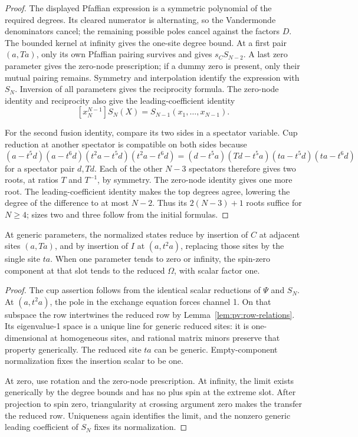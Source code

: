 \begin{proof}
The displayed Pfaffian expression is a symmetric polynomial of the
required degrees. Its cleared numerator is alternating, so the
Vandermonde denominators cancel; the remaining possible poles cancel
against the factors \(D\). The bounded kernel at infinity gives the
one-site degree bound. At a first pair \((a,Ta)\), only its own
Pfaffian pairing survives and gives \(s_C S_{N-2}\). A last zero
parameter gives the zero-node prescription; if a dummy zero is present,
only their mutual pairing remains. Symmetry and interpolation identify
the expression with \(S_N\). Inversion of all parameters gives the
reciprocity formula. The zero-node identity and reciprocity also give
the leading-coefficient identity
\[
 [x_N^{N-1}]S_N(X)=S_{N-1}(x_1,\ldots,x_{N-1}).
\]

For the second fusion identity, compare its two sides in a spectator
variable. Cup reduction at another spectator is compatible on both
sides because
\[
 (a-t^5d)(a-t^6d)(t^2a-t^5d)(t^2a-t^6d)
 =(d-t^5a)(Td-t^5a)(ta-t^5d)(ta-t^6d)
\]
for a spectator pair \(d,Td\). Each of the other \(N-3\) spectators
therefore gives two roots, at ratios \(T\) and \(T^{-1}\), by symmetry.
The zero-node identity gives one more root. The leading-coefficient
identity makes the top degrees agree, lowering the degree of the
difference to at most \(N-2\). Thus its \(2(N-3)+1\) roots suffice
for \(N\ge4\); sizes two and three follow from the initial formulas.
\end{proof}

\begin{corollary}\label{cor:pv:normalized-reductions}
At generic parameters, the normalized states reduce by insertion of
\(C\) at adjacent sites \((a,Ta)\), and by insertion of \(I\) at
\((a,t^2a)\), replacing those sites by the single site \(ta\).
When one parameter tends to zero or infinity, the spin-zero component
at that slot tends to the reduced \(\Omega\), with scalar factor one.
\end{corollary}

\begin{proof}
The cup assertion follows from the identical scalar reductions of
\(\Psi\) and \(S_N\). At \((a,t^2a)\), the pole in the exchange
equation forces channel 1. On that subspace the row intertwines the
reduced row by Lemma~\ref{lem:pv:row-relations}. Its eigenvalue-1
space is a unique line for generic reduced sites: it is one-dimensional
at homogeneous sites, and rational matrix minors preserve that property
generically. The reduced site \(ta\) can be generic. Empty-component
normalization fixes the insertion scalar to be one.

At zero, use rotation and the zero-node prescription. At infinity,
the limit exists generically by the degree bounds and has no plus
spin at the extreme slot. After projection to spin zero, triangularity
at crossing argument zero makes the transfer the reduced row.
Uniqueness again identifies the limit, and the nonzero generic leading
coefficient of \(S_N\) fixes its normalization.
\end{proof}
